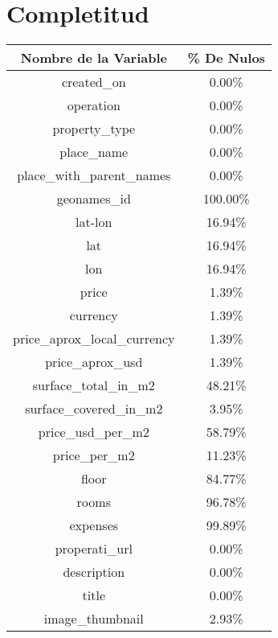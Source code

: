 \documentclass{report}
\begin{document}
    \section{Completitud}
    \begin{center}
        \begin{tabular}{||c|c||} 
            \hline
            Nombre de la Variable & \% De Nulos \\
            \hline\hline
            created\_on & 0.00\%\\
            \hline
            operation & 0.00\%\\
            \hline
            property\_type & 0.00\%\\
            \hline
            place\_name & 0.00\%\\
            \hline
            place\_with\_parent\_names & 0.00\%\\
            \hline
            geonames\_id 	& 	100.00\%\\
            \hline
            lat-lon & 16.94\%\\
            \hline
            lat & 16.94\%\\
            \hline
            lon & 16.94\%\\
            \hline
            price & 1.39\%\\
            \hline
            currency & 1.39\%\\
            \hline
            price\_aprox\_local\_currency & 1.39\%\\
            \hline
            price\_aprox\_usd             &   1.39\%\\
            \hline
            surface\_total\_in\_m2     &      48.21\%\\
            \hline
            surface\_covered\_in\_m2    &      3.95\%\\
            \hline
            price\_usd\_per\_m2 	& 	58.79\%\\
            \hline
            price\_per\_m2             &     11.23\%\\
            \hline
            floor 	& 	84.77\%\\
            \hline
            rooms 	& 	96.78\%\\
            \hline
            expenses 	& 	99.89\%\\
            \hline
            properati\_url            &      0.00\%\\
            \hline
            description               &     0.00\%\\
            \hline
            title                      &    0.00\%\\
            \hline
            image\_thumbnail             &   2.93\%\\
            \hline
 
        \end{tabular}
    \end{center}
    
\end{document}
